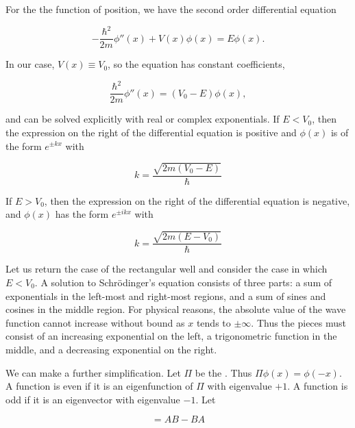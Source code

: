 For the the function of position, we have the second order
differential equation 

\begin{equation}
 -\frac{\hbar^2}{2m}\phi''(x)+ V(x)\phi(x) = E\phi(x).
\end{equation}

In our case, $V(x) \equiv V_0$, so  the equation has constant coefficients,

\begin{equation}
 \frac{\hbar^2}{2m}\phi''(x) = (V_0-E)\phi(x),
\end{equation}

and can be solved explicitly with real or complex exponentials.  If $E < V_0$, then the expression on the right of the differential equation is positive and $\phi(x)$ is of the form  $e^{\pm kx}$ with

\begin{equation}
k = \frac{\sqrt{2m(V_0-E)}}{\hbar}
\end{equation}

If $E > V_0$, then the expression on the right of the differential equation is negative, and  $\phi(x)$ has the form $e^{\pm i kx}$ with

\begin{equation}
k = \frac{\sqrt{2m(E-V_0)}}{\hbar}
\end{equation}


Let us return the case of the rectangular well and consider the case in which $E < V_0$.   A solution to Schrödinger's equation consists of three parts: a sum of exponentials in the left-most and right-most regions, and a sum of sines and cosines in the middle region.  For physical reasons, the absolute value of the wave function cannot increase without bound as $x$ tends to $\pm \infty$.  Thus the pieces must consist of an increasing exponential on the left, a trigonometric function in the middle, and a decreasing exponential on the right.

We can make a further simplification.  Let $\Pi$ be the . Thus $\Pi\phi(x) = \phi(-x)$.  A function is even if it 
is an eigenfunction of $\Pi$ with eigenvalue $+1$.  A function is odd if it is an eigenvector with eigenvalue $-1$.
Let 

\begin{equation}
   [ A,B ]  = AB - BA
\end{equation}

